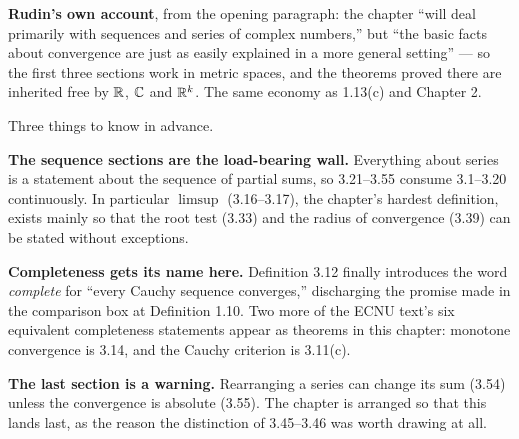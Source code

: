 \begin{roadmap}
\textbf{Rudin's own account}, from the opening paragraph: the chapter ``will
deal primarily with sequences and series of complex numbers,'' but ``the basic
facts about convergence are just as easily explained in a more general
setting'' --- so the first three sections work in metric spaces, and the
theorems proved there are inherited free by $\mathbb{R}$, $\mathbb{C}$ and $\mathbb{R}^k$. The same
economy as 1.13(c) and Chapter 2.

\medskip
\centering
{}

\medskip
\raggedright
Three things to know in advance.

\smallskip
\textbf{The sequence sections are the load-bearing wall.} Everything about
series is a statement about the sequence of partial sums, so 3.21--3.55 consume
3.1--3.20 continuously. In particular $\limsup$ (3.16--3.17), the chapter's
hardest definition, exists mainly so that the root test (3.33) and the radius
of convergence (3.39) can be stated without exceptions.

\smallskip
\textbf{Completeness gets its name here.} Definition 3.12 finally introduces
the word \emph{complete} for ``every Cauchy sequence converges,'' discharging
the promise made in the comparison box at Definition 1.10. Two more of the
ECNU text's six equivalent completeness statements appear as theorems in this
chapter: monotone convergence is 3.14, and the Cauchy criterion is 3.11(c).

\smallskip
\textbf{The last section is a warning.} Rearranging a series can change its
sum (3.54) unless the convergence is absolute (3.55). The chapter is arranged
so that this lands last, as the reason the distinction of 3.45--3.46 was worth
drawing at all.
\end{roadmap}

